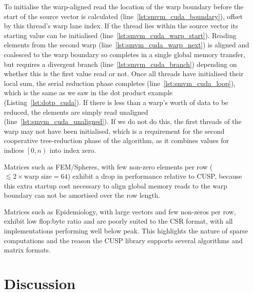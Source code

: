 To initialise the warp-aligned read the location of the warp boundary before the
start of the source vector is calculated (line~\ref{lst:smvm_cuda_boundary}),
offset by this thread's warp lane index. If the thread lies within the source
vector its starting value can be initialised
(line~\ref{lst:smvm_cuda_warp_start}). Reading elements from the second warp
(line~\ref{lst:smvm_cuda_warp_next}) is aligned and coalesced to the warp
boundary so completes in a single global memory transfer, but requires a
divergent branch (line~\ref{lst:smvm_cuda_branch}) depending on whether this is
the first value read or not. Once all threads have initialised their local sum,
the serial reduction phase completes (line~\ref{lst:smvm_cuda_loop}), which is
the same as we saw in the dot product example (Listing~\ref{lst:dotp_cuda}). If
there is less than a warp's worth of data to be reduced, the elements are simply
read unaligned (line~\ref{lst:smvm_cuda_unaligned}). If we do not do this, the
first threads of the warp may not have been initialised, which is a requirement
for the second cooperative tree-reduction phase of the algorithm, as it combines
values for indices $\left[0,n\right)$ into index zero.

Matrices such as FEM/Spheres, with few non-zero elements per row ($\lesssim 2
\times \text{warp size} = 64$) exhibit a drop in performance relative to CUSP,
because this extra startup cost necessary to align global memory reads to the
warp boundary can not be amortised over the row length.

Matrices such as Epidemiology, with large vectors and few non-zeros per row,
exhibit low flop:byte ratio and are poorly suited to the CSR format, with all
implementations performing well below peak. This highlights the nature of sparse
computations and the reason the CUSP library supports several algorithms and
matrix formats.

%
%

\section{Discussion}

